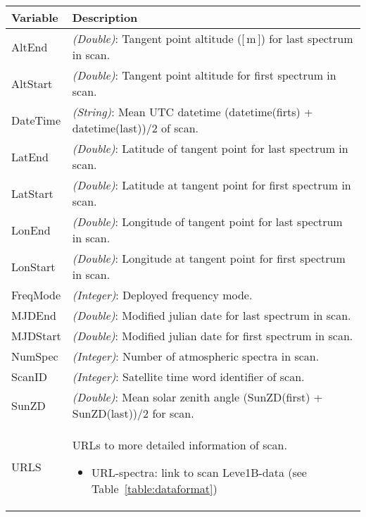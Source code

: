 \begin{table}
\caption{ Odin scan log data format. Latitudes and longitudes are given as geodetic
coordinates using WGS84 reference ellipsoid. Example URL
\url{http://malachite.rss.chalmers.se/rest_api/v4/freqmode_info/2015-01-03/AC1/2/}}
\label{table:logdataformat}
\begin{longtable}{| p{} | p{} |}
\hline
  \textbf{Variable} & \textbf{Description} \\
  \hline
    AltEnd                & \emph{(Double)}: Tangent point altitude ([\,m\,]) for last spectrum in scan. \\ \hline
    AltStart              & \emph{(Double)}: Tangent point altitude for first spectrum in scan. \\ \hline
    DateTime              & \emph{(String)}: Mean UTC datetime (datetime(firts) + datetime(last))/2 of scan. \\ \hline
    LatEnd                & \emph{(Double)}: Latitude of tangent point for last spectrum in scan. \\ \hline
    LatStart              & \emph{(Double)}: Latitude at tangent point for first spectrum in scan. \\ \hline
    LonEnd                & \emph{(Double)}: Longitude of tangent point for last spectrum in scan. \\ \hline
    LonStart              & \emph{(Double)}: Longitude at tangent point for first spectrum in scan. \\ \hline
    FreqMode              & \emph{(Integer)}: Deployed frequency mode. \\ \hline
    MJDEnd                & \emph{(Double)}: Modified julian date for last spectrum in scan. \\ \hline
    MJDStart              & \emph{(Double)}: Modified julian date for first spectrum in scan. \\ \hline
    NumSpec               & \emph{(Integer)}: Number of atmospheric spectra in scan. \\ \hline
    ScanID                & \emph{(Integer)}: Satellite time word identifier of scan.\\ \hline
    SunZD                 & \emph{(Double)}: Mean solar zenith angle  (SunZD(first) + SunZD(last))/2 for scan.\\ \hline
    URLS                  & URLs to more detailed information of scan. 
                            \begin{itemize}
                             \item URL-spectra: link to scan Leve1B-data (see Table~\ref{table:dataformat})

\end{itemize}
\end{longtable}
\end{table}
